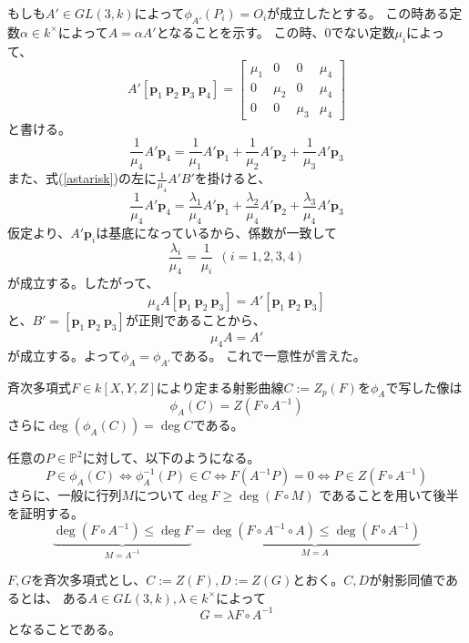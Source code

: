 \documentclass[a4]{article}
\newcommand{\proj}{\mathbb{P}}
\begin{document}
\begin{Proof}
        もしも$A' \in GL(3,k)$によって$\phi_{A'}(P_i)=O_i$が成立したとする。
        この時ある定数$\alpha \in k^{\times}$によって$A=\alpha A'$となることを示す。
        この時、0でない定数$\mu_i$によって、
        \[
            A'[\mathbf{p}_1~\mathbf{p}_2~\mathbf{p}_3~\mathbf{p}_4]
            =
            \begin{bmatrix}
                \mu_1& 0& 0& \mu_4 \\
                0& \mu_2& 0& \mu_4 \\
                0& 0& \mu_3& \mu_4
            \end{bmatrix}
        \]
        と書ける。
        \[ \frac{1}{\mu_4}A'\mathbf{p}_4=\frac{1}{\mu_1}A'\mathbf{p}_1+\frac{1}{\mu_2}A'\mathbf{p}_2+\frac{1}{\mu_3}A'\mathbf{p}_3 \]
        また、式(\ref{astarisk})の左に$\frac{1}{\mu_4} A'B'$を掛けると、
        \[ \frac{1}{\mu_4}A'\mathbf{p}_4=\frac{\lambda_1}{\mu_4}A'\mathbf{p}_1+\frac{\lambda_2}{\mu_4}A'\mathbf{p}_2+\frac{\lambda_3}{\mu_4}A'\mathbf{p}_3 \]
        仮定より、$A'\mathbf{p}_i$は基底になっているから、係数が一致して
        \[ \frac{\lambda_i}{\mu_4}=\frac{1}{\mu_i} ~~(i=1,2,3,4) \]
        が成立する。したがって、
        \[ \mu_4 A [\mathbf{p}_1~\mathbf{p}_2~\mathbf{p}_3]=A'[\mathbf{p}_1~\mathbf{p}_2~\mathbf{p}_3] \]
        と、$B'=[\mathbf{p}_1~\mathbf{p}_2~\mathbf{p}_3]$が正則であることから、
        \[ \mu_4 A=A' \]
        が成立する。よって$\phi_A=\phi_{A'}$である。
        これで一意性が言えた。
        \QED
    \end{Proof}

    \begin{Lemma}
        斉次多項式$F \in k[X, Y, Z]$により定まる射影曲線$C:=Z_p(F)$を$\phi_A$で写した像は
        \[\phi_A(C)=Z(F \circ A^{-1}) \]
        さらに$\deg(\phi_A(C))=\deg C$である。
    \end{Lemma}
    \begin{Proof}
        任意の$P \in \proj^2$に対して、以下のようになる。
        \[ P \in \phi_A(C) \iff \phi^{-1}_A(P) \in C \iff F(A^{-1} P)=0 \iff P \in Z(F \circ A^{-1}) \]
        さらに、一般に行列$M$について$\deg F \geq \deg (F \circ M)$
        であることを用いて後半を証明する。
        \[
            \underbrace{\deg (F \circ A^{-1}) \leq \deg F}_{M=A^{-1}}
            =
            \underbrace{\deg (F \circ A^{-1} \circ A) \leq \deg(F \circ A^{-1})}_{M=A}
        \]
        \QED
    \end{Proof}

    \begin{Def}
        $F, G$を斉次多項式とし、$C:=Z(F), D:=Z(G)$とおく。$C,D$が射影同値であるとは、
        ある$A \in GL(3,k), \lambda \in k^{\times}$によって
        \[ G=\lambda F \circ A^{-1} \]
        となることである。
    \end{Def}
\end{document}
